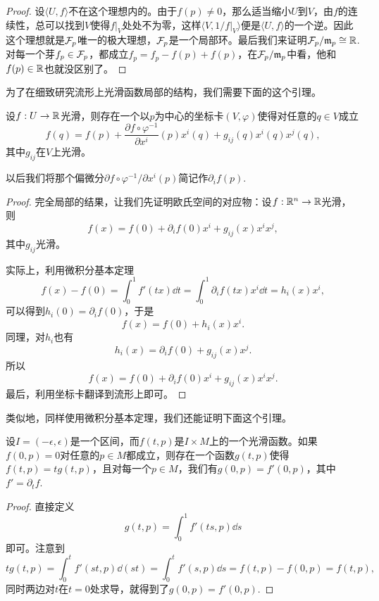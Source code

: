 \begin{proof}
设$\langle U,f\rangle$不在这个理想内的。由于$f(p)\neq 0$，那么适当缩小$U$到$V$，由$f$的连续性，总可以找到$V$使得$f|_V$处处不为零，这样$\langle V,1/f|_V\rangle$便是$\langle U,f\rangle$的一个逆。因此这个理想就是$\mathcal{F}_p$唯一的极大理想，$\mathcal{F}_p$是一个局部环。最后我们来证明$\mathcal{F}_p/\mathfrak{m}_p\cong \mathbb{R}$. 对每一个芽$f_p\in\mathcal{F}_p$，都成立$f_p=f_p-f(p)+f(p)$，在$\mathcal{F}_p/\mathfrak{m}_p$中看，他和$f(p)\in\mathbb{R}$也就没区别了。
\end{proof}

为了在细致研究流形上光滑函数局部的结构，我们需要下面的这个引理。

\begin{lem}\label{lem:1.1.5}
设$f:U\to \mathbb{R}$光滑，则存在一个以$p$为中心的坐标卡$(V,\varphi)$使得对任意的$q\in V$成立
\[
	f(q)=f(p)+\frac{\partial f\circ \varphi^{-1}}{\partial x^i}(p)x^i(q)+g_{ij}(q)x^i(q)x^j(q),
\]
其中$g_{ij}$在$V$上光滑。
\end{lem}

以后我们将那个偏微分$\partial f\circ \varphi^{-1}/\partial x^i (p)$简记作$\partial_i f(p)$.

\begin{proof}
完全局部的结果，让我们先证明欧氏空间的对应物：设$f:\mathbb{R}^n\to \mathbb{R}$光滑，则
\[
	f(x)=f(0)+\partial_if(0)x^i+g_{ij}(x)x^ix^j,
\]
其中$g_{ij}$光滑。

实际上，利用微积分基本定理
\[
	f(x)-f(0)=\int_0^1f'(tx)\dd t=\int_0^1\partial_i f(tx)x^i\dd t=h_i(x)x^i,
\]
可以得到$h_i(0)=\partial_i f(0)$，于是
\[
	f(x)=f(0)+h_i(x)x^i.
\]
同理，对$h_i$也有
\[
	h_i(x)=\partial_i f(0)+g_{ij}(x)x^j.
\]
所以
\[
	f(x)=f(0)+\partial_i f(0)x^i+g_{ij}(x)x^ix^j.
\]
最后，利用坐标卡翻译到流形上即可。
\end{proof}

类似地，同样使用微积分基本定理，我们还能证明下面这个引理。

\begin{lem}\label{lem:1.5}
设$I=(-\epsilon,\epsilon)$是一个区间，而$f(t,p)$是$I\times M$上的一个光滑函数。如果$f(0,p)=0$对任意的$p\in M$都成立，则存在一个函数$g(t,p)$使得$f(t,p)=tg(t,p)$，且对每一个$p\in M$，我们有$g(0,p)=f'(0,p)$，其中$f'=\partial_t f$.
\end{lem}

\begin{proof}
	直接定义
	\[
	g(t,p)=\int_0^1 f'(ts,p)\dd s
	\]
	即可。注意到
	\[
	tg(t,p)=\int_0^tf'(st,p)\dd (st)=\int_0^tf'(s,p)\dd s=f(t,p)-f(0,p)=f(t,p),
	\]
	同时两边对$t$在$t=0$处求导，就得到了$g(0,p)=f'(0,p)$.
\end{proof}

